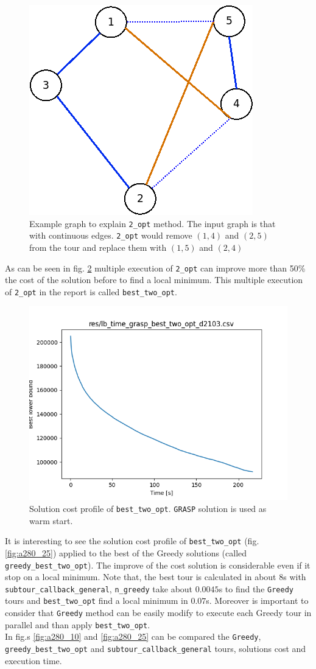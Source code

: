 \begin{figure}[h]
	\centering
	\includegraphics[width=.3\columnwidth]{img/2_opt_graph.png}
	\caption{Example graph to explain \texttt{2\_opt} method. The input graph is that with continuous edges. \texttt{2\_opt} would remove $ (1,4) $ and $ (2,5) $ from the tour and replace them with $ (1,5) $ and $  (2,4) $}
	\label{fig:2_opt_graph}
\end{figure}
As can be seen in fig. \ref{fig:lb_time_grasp_best_two_opt_d2103} multiple execution of \texttt{2\_opt} can improve more than 50\% the cost of the solution before to find a local minimum. This multiple execution of \texttt{2\_opt} in the report is called \texttt{best\_two\_opt}.
\begin{figure}[!h]
\centering
\includegraphics[width=.6\columnwidth]{../res/lb_time_grasp_best_two_opt_d2103.png}
\caption{Solution cost profile of \texttt{best\_two\_opt}. \texttt{GRASP} solution is used as warm start.}
\label{fig:lb_time_grasp_best_two_opt_d2103}
\end{figure}

It is interesting to see the solution cost profile of \texttt{best\_two\_opt} (fig. \ref{fig:a280_25}) applied to the best of the Greedy solutions (called \texttt{greedy\_best\_two\_opt}). The improve of the cost solution is considerable even if it stop on a local minimum.  Note that, the best tour is calculated in about $ 8 $s with \texttt{subtour\_callback\_general}, \texttt{n\_greedy} take about $ 0.0045 $s to find the \texttt{Greedy} tours and \texttt{best\_two\_opt} find a local minimum in $0.07$s. Moreover is important to consider that \texttt{Greedy} method can be easily modify to execute each Greedy tour in parallel and than apply \texttt{best\_two\_opt}.\\
In fig.s \ref{fig:a280_10} and \ref{fig:a280_25} can be compared the \texttt{Greedy}, \texttt{greedy\_best\_two\_opt} and \texttt{subtour\_callback\_general} tours, solutions cost and execution time.\\


